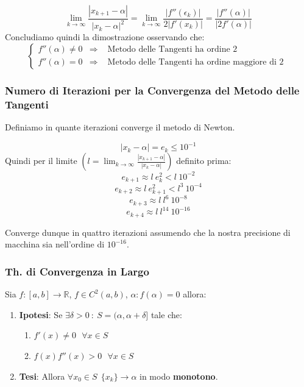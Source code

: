 \documentclass{article}
\begin{document}
\begin{enumerate}
\begin{enumerate}
        \[ \lim_{k \rightarrow \infty} \frac{|x_{k+1} - \alpha|}{|x_{k} - \alpha|^{2}} = \lim_{k \rightarrow \infty} \frac{|f''(\epsilon_{k})|}{2|f'(x_{k})|} = \frac{|f''(\alpha)|}{|2f'(\alpha)|} \]
        Concludiamo quindi la dimostrazione osservando che: 
        \[
        \left\{
        \begin{array}{lll}
            f''(\alpha) \neq 0 & \Rightarrow & \text{ Metodo delle Tangenti ha ordine 2 } \\
            f''(\alpha) = 0 & \Rightarrow & \text{ Metodo delle Tangenti ha ordine maggiore di 2 } 
        \end{array}
        \right.
        \]
    \end{enumerate}
\end{enumerate}

\subsubsection{Numero di Iterazioni per la Convergenza del Metodo delle Tangenti}

Definiamo in quante iterazioni converge il metodo di Newton.

\[ |x_{k} - \alpha | = e_{k} \leq 10^{-1} \]
Quindi per il limite $(l = \lim_{k \rightarrow \infty } \frac{|x_{k+1} - \alpha|}{|x_{k} - \alpha|})$ definito prima:
\[ e_{k+1} \approx l \: e^{2}_{k} < l \: 10^{-2} \]
\[ e_{k+2} \approx l \: e^{2}_{k+1} < l^{3} \: 10^{-4} \]
\[ e_{k+3} \approx l\:l^{6} \: 10^{-8} \]
\[ e_{k+4} \approx l\:l^{14} \: 10^{-16} \]

Converge dunque in quattro iterazioni assumendo che la nostra precisione di macchina sia nell'ordine di $10^{-16}$.

\subsubsection{Th. di Convergenza in Largo}

Sia $f:[a,b] \rightarrow \mathbb{R}$, $f \in C^{2}(a,b)$, $\alpha : f(\alpha) = 0$ allora:

\begin{enumerate}
    \item \textbf{Ipotesi}: Se $\exists \delta > 0 \::\: S = (\alpha, \alpha + \delta]$ tale che:
    \begin{enumerate}
        \item $f'(x) \neq 0 \:\:\: \forall x \in S$
        \item $f(x)f''(x) > 0\:\:\: \forall x \in S$
    \end{enumerate}
    \item \textbf{Tesi}: Allora $\forall x_{0} \in S \:\: \{ x_{k} \} \rightarrow \alpha$ in modo \textbf{monotono}.
\end{enumerate}

\newpage
\end{document}
